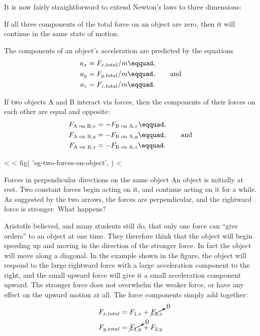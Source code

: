 It is now fairly straightforward to extend Newton's laws
to three dimensions:

\begin{lessimportant}
  If all three components of the total force on an object are
  zero, then it will continue in the same state of motion.
\end{lessimportant}

\begin{lessimportant}
The components of an object's acceleration are predicted by the equations
\begin{align*}
        a_x  &=  F_{x,total}/m\eqquad,  \\
        a_y  &=  F_{y,total}/m\eqquad, \qquad \text{and}  \\
        a_z  &=  F_{z,total}/m\eqquad.
\end{align*}
\end{lessimportant}

\begin{lessimportant}
If two objects A and B interact via forces, then the
components of their forces on each other are equal and opposite:
\begin{align*}
        F_{\text{A on B},x}  &=  -F_{\text{B on A},x}\eqquad,  \\
        F_{\text{A on B},y}  &=  -F_{\text{B on A},y}\eqquad, \qquad \text{and}  \\
        F_{\text{A on B},z}  &=  -F_{\text{B on A},z}\eqquad.
\end{align*}
\end{lessimportant}

<%
<%
  fig(
    'eg-two-forces-on-object',
  )
<%
\begin{eg}{Forces in perpendicular directions on the same object}\label{eg:two-forces-on-object}
\egquestion An object is initially at rest. Two constant
forces begin acting on it, and continue acting on it for a
while. As suggested by the two arrows, the forces are
perpendicular, and the rightward force is stronger. What happens?

\eganswer
 Aristotle believed, and many students still do, that
only one force can ``give orders'' to an object at one time.
They therefore think that the object will begin speeding up
and moving in the direction of the stronger force. In fact
the object will move along a diagonal. In the example shown
in the figure, the object will respond to the large
rightward force with a large acceleration component to the
right, and the small upward force will give it a small
acceleration component upward. The stronger force does not
overwhelm the weaker force, or have any effect on the upward
motion at all. The force components simply add together:
\begin{align*}
  F_{x,total} &= F_{1,x} + \cancelto{0}{F_{2,x}} \\
  F_{y,total} &= \cancelto{0}{F_{1,y}} + F_{2,y} 
\end{align*}
\end{eg}

